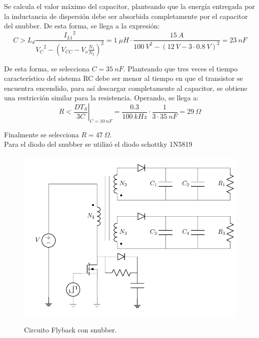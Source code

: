 Se calcula el valor máximo del capacitor, planteando que la energía entregada por la inductancia de dispersión debe ser absorbida completamente por el capacitor del snubber. De esta forma, se llega a la expresión:
\begin{equation}
	C > L_d  \frac{{I_{L1}}^2}{{V_{C}}^2 - \left( V_{CC} - V_{o} \frac{N_1}{N_2} \right)^2 } = 1 \ \mu H \cdot \frac{15 \ A}{{100 \ V}^2 - \left( 12 \ V - 3 \cdot 0.8 \ V \right)^2} = 23 \ nF
\end{equation}

De esta forma, se selecciona $C = 35 \ nF$. Planteando que tres veces el tiempo característico del sistema RC debe ser menor al tiempo en que el transistor se encuentra encendido, para así descargar completamente al capacitor, se obtiene una restricción similar para la resistencia. Operando, se llega a:
\begin{equation}
	R < \left. \frac{DT_S}{3C} \right|_{C = 10 \ nF} = \frac{0.3}{100 \ kHz} \cdot \frac{1}{3 \cdot 35 \ nF} = 29 \ \Omega
\end{equation}


Finalmente se selecciona $R = 47 \ \Omega$. \\
Para el diodo del snubber se utilizó el diodo schottky 1N5819

\begin{figure}[H]
	\centering
	\includegraphics[width=0.4\linewidth, page = 1]{ImagenesParteII/FlybackSnubber.pdf}
	\label{fig:fly_snubber}
	\caption{Circuito Flyback con snubber.}
\end{figure}


